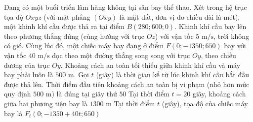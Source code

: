 \begin{ex}%
	Đang có một buổi triển lãm hàng không tại sân bay thể thao. Xét trong hệ trục tọa độ $Oxyz$ (với mặt phẳng $(Oxy)$ là mặt đất, đơn vị đo chiều dài là mét), một khinh khí cầu được thả ra tại điểm $B(280; 600; 0)$. Khinh khí cầu bay lên theo phương thẳng đứng (cùng hướng với trục $Oz$) với vận tốc $5\text{ m/s}$, trời không có gió. Cùng lúc đó, một chiếc máy bay đang ở điểm $F(0; -1350; 650)$ bay với vận tốc $40\text{ m/s}$ dọc theo một đường thẳng song song với trục $Oy$, theo chiều dương của trục $Oy$. Khoảng cách an toàn tối thiểu giữa khinh khí cầu và máy bay phải luôn là $500\text{ m}$. Gọi $t$ (giây) là thời gian kể từ lúc khinh khí cầu bắt đầu được thả lên.
	{Thời điểm đầu tiên khoảng cách an toàn bị vi phạm (nhỏ hơn mức quy định $500\text{ m}$) là đúng tại giây thứ $50$}
	{Tại thời điểm $t = 20$ giây, khoảng cách giữa hai phương tiện bay là $1300\text{ m}$}
	{\True Tại thời điểm $t$ (giây), tọa độ của chiếc máy bay là $F_t(0; -1350 + 40t; 650)$}
\end{ex}

